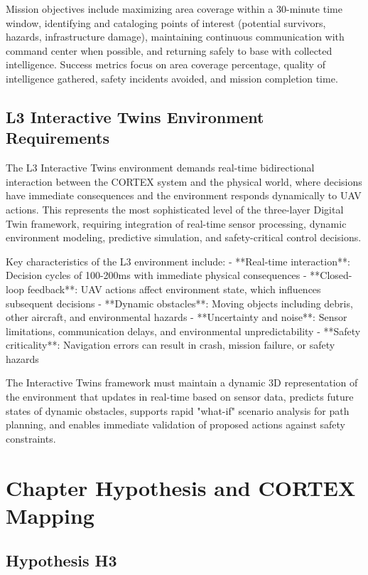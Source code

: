 Mission objectives include maximizing area coverage within a 30-minute time window, identifying and cataloging points of interest (potential survivors, hazards, infrastructure damage), maintaining continuous communication with command center when possible, and returning safely to base with collected intelligence. Success metrics focus on area coverage percentage, quality of intelligence gathered, safety incidents avoided, and mission completion time.

\subsection{L3 Interactive Twins Environment Requirements}

The L3 Interactive Twins environment demands real-time bidirectional interaction between the CORTEX system and the physical world, where decisions have immediate consequences and the environment responds dynamically to UAV actions. This represents the most sophisticated level of the three-layer Digital Twin framework, requiring integration of real-time sensor processing, dynamic environment modeling, predictive simulation, and safety-critical control decisions.

Key characteristics of the L3 environment include:
- **Real-time interaction**: Decision cycles of 100-200ms with immediate physical consequences
- **Closed-loop feedback**: UAV actions affect environment state, which influences subsequent decisions
- **Dynamic obstacles**: Moving objects including debris, other aircraft, and environmental hazards
- **Uncertainty and noise**: Sensor limitations, communication delays, and environmental unpredictability
- **Safety criticality**: Navigation errors can result in crash, mission failure, or safety hazards

The Interactive Twins framework must maintain a dynamic 3D representation of the environment that updates in real-time based on sensor data, predicts future states of dynamic obstacles, supports rapid "what-if" scenario analysis for path planning, and enables immediate validation of proposed actions against safety constraints.

\section{Chapter Hypothesis and CORTEX Mapping}

\subsection{Hypothesis H3}

